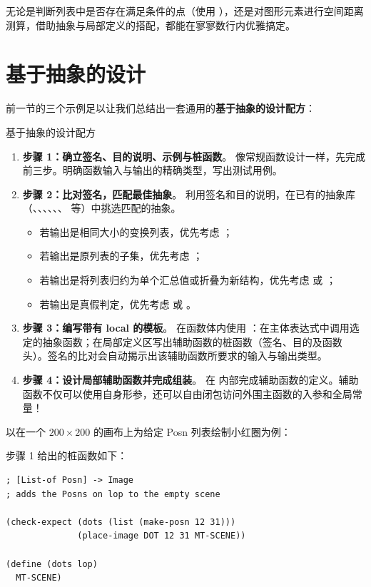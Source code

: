 无论是判断列表中是否存在满足条件的点（使用 ），还是对图形元素进行空间距离测算，借助抽象与局部定义的搭配，都能在寥寥数行内优雅搞定。

\section{基于抽象的设计}
\label{sec:16_6}

前一节的三个示例足以让我们总结出一套通用的\textbf{基于抽象的设计配方}：

\begin{recipebox}{基于抽象的设计配方}
\begin{enumerate}
  \item \textbf{步骤 1：确立签名、目的说明、示例与桩函数}。
    像常规函数设计一样，先完成前三步。明确函数输入与输出的精确类型，写出测试用例。
  \item \textbf{步骤 2：比对签名，匹配最佳抽象}。
    利用签名和目的说明，在已有的抽象库（、、、、、、 等）中挑选匹配的抽象。
    \begin{itemize}
      \item 若输出是相同大小的变换列表，优先考虑 ；
      \item 若输出是原列表的子集，优先考虑 ；
      \item 若输出是将列表归约为单个汇总值或折叠为新结构，优先考虑  或 ；
      \item 若输出是真假判定，优先考虑  或 。
    \end{itemize}
  \item \textbf{步骤 3：编写带有 local 的模板}。
    在函数体内使用 ：在主体表达式中调用选定的抽象函数；在局部定义区写出辅助函数的桩函数（签名、目的及函数头）。签名的比对会自动揭示出该辅助函数所要求的输入与输出类型。
  \item \textbf{步骤 4：设计局部辅助函数并完成组装}。
    在  内部完成辅助函数的定义。辅助函数不仅可以使用自身形参，还可以自由闭包访问外围主函数的入参和全局常量！
\end{enumerate}
\end{recipebox}

以在一个 $200 \times 200$ 的画布上为给定 Posn 列表绘制小红圈为例：

步骤 1 给出的桩函数如下：
\begin{lstlisting}[language=BSL]
; [List-of Posn] -> Image
; adds the Posns on lop to the empty scene

(check-expect (dots (list (make-posn 12 31)))
              (place-image DOT 12 31 MT-SCENE))

(define (dots lop)
  MT-SCENE)
\end{lstlisting}

